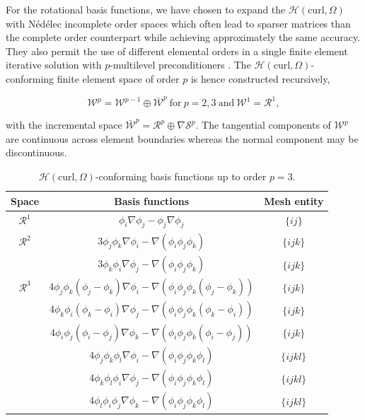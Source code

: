 For the rotational basis functions, we have chosen to expand the $\mathcal{H}(\mathrm{curl},\Omega)$ with N\'ed\'elec incomplete order spaces \cite{nedelec1980mixed} which often lead to sparser matrices than the complete order counterpart while achieving approximately the same accuracy. They also permit the use of different elemental orders in a single finite element iterative solution with $p$-multilevel preconditioners \cite{sun2001construction}. The $\mathcal{H}(\mathrm{curl},\Omega)$-conforming finite element space of order $p$ is hence constructed recursively,

$$\mathcal{W}^p = \mathcal{W}^{p-1} \oplus \bar{\mathcal{W}}^{p} \ \mathrm{for} \ p = 2, 3 \ \mathrm{and} \ \mathcal{W}^{1}= \mathcal{R}^{1},$$

\noindent with the incremental space $\bar{\mathcal{W}}^p = \mathcal{R}^p \oplus \nabla \mathcal{S}^p$. The tangential components of $\mathcal{W}^p$ are continuous across element boundaries whereas the normal component may be discontinuous.

\begin{table}[h!]
\begin{center}
\begin{tabular}{|c|c|c|}
\hline 
Space & Basis functions & Mesh entity \\
\hline
\hline 
$\mathcal{R}^1$ & $\phi_i\nabla\phi_j-\phi_j\nabla\phi_j$ & $\lbrace ij \rbrace$ \\
\hline 
$\mathcal{R}^2$ & $3\phi_j\phi_k\nabla\phi_i-\nabla(\phi_i\phi_j\phi_k)$ & $\lbrace ijk \rbrace$ \\
 & $3\phi_k\phi_i\nabla\phi_j-\nabla(\phi_i\phi_j\phi_k)$ & $\lbrace ijk \rbrace$ \\
\hline 
$\mathcal{R}^3$ & $4\phi_j\phi_k(\phi_j - \phi_k)\nabla\phi_i - \nabla\left(\phi_i\phi_j\phi_k(\phi_j-\phi_k)\right)$ & $\lbrace ijk \rbrace$ \\
 & $4\phi_k\phi_i(\phi_k - \phi_i)\nabla\phi_j - \nabla\left(\phi_i\phi_j\phi_k(\phi_k-\phi_i)\right)$ & $\lbrace ijk \rbrace$ \\
 & $4\phi_i\phi_j(\phi_i - \phi_j)\nabla\phi_k - \nabla\left(\phi_i\phi_j\phi_k(\phi_i-\phi_j)\right)$ & $\lbrace ijk \rbrace$ \\
 & $4\phi_j\phi_k\phi_l\nabla\phi_i - \nabla(\phi_i\phi_j\phi_k\phi_l)$ & $\lbrace ijkl \rbrace$ \\ 
 & $4\phi_k\phi_l\phi_i\nabla\phi_j - \nabla(\phi_i\phi_j\phi_k\phi_l)$ & $\lbrace ijkl \rbrace$ \\ 
 & $4\phi_l\phi_i\phi_j\nabla\phi_k - \nabla(\phi_i\phi_j\phi_k\phi_l)$ & $\lbrace ijkl \rbrace$ \\ 
\hline 
\end{tabular} 
\end{center}
\caption{$\mathcal{H}(\mathrm{curl},\Omega)$-conforming basis functions up to order $p = 3$.}
\label{tab:Hcurlfunctions}
\end{table}

